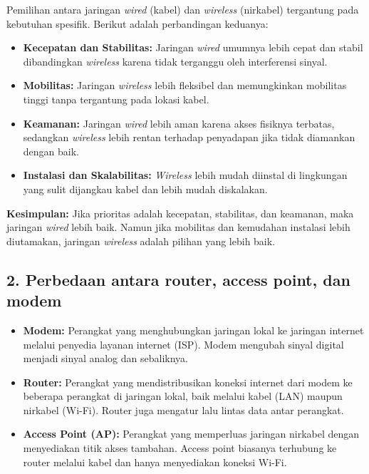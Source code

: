 Pemilihan antara jaringan \textit{wired} (kabel) dan \textit{wireless} (nirkabel) tergantung pada kebutuhan spesifik. Berikut adalah perbandingan keduanya:

\begin{itemize}
    \item \textbf{Kecepatan dan Stabilitas:} Jaringan \textit{wired} umumnya lebih cepat dan stabil dibandingkan \textit{wireless} karena tidak terganggu oleh interferensi sinyal.
    \item \textbf{Mobilitas:} Jaringan \textit{wireless} lebih fleksibel dan memungkinkan mobilitas tinggi tanpa tergantung pada lokasi kabel.
    \item \textbf{Keamanan:} Jaringan \textit{wired} lebih aman karena akses fisiknya terbatas, sedangkan \textit{wireless} lebih rentan terhadap penyadapan jika tidak diamankan dengan baik.
    \item \textbf{Instalasi dan Skalabilitas:} \textit{Wireless} lebih mudah diinstal di lingkungan yang sulit dijangkau kabel dan lebih mudah diskalakan.
\end{itemize}

\textbf{Kesimpulan:} Jika prioritas adalah kecepatan, stabilitas, dan keamanan, maka jaringan \textit{wired} lebih baik. Namun jika mobilitas dan kemudahan instalasi lebih diutamakan, jaringan \textit{wireless} adalah pilihan yang lebih baik.

\subsection*{2. Perbedaan antara router, access point, dan modem}

\begin{itemize}
    \item \textbf{Modem:} Perangkat yang menghubungkan jaringan lokal ke jaringan internet melalui penyedia layanan internet (ISP). Modem mengubah sinyal digital menjadi sinyal analog dan sebaliknya.
    
    \item \textbf{Router:} Perangkat yang mendistribusikan koneksi internet dari modem ke beberapa perangkat di jaringan lokal, baik melalui kabel (LAN) maupun nirkabel (Wi-Fi). Router juga mengatur lalu lintas data antar perangkat.
    
    \item \textbf{Access Point (AP):} Perangkat yang memperluas jaringan nirkabel dengan menyediakan titik akses tambahan. Access point biasanya terhubung ke router melalui kabel dan hanya menyediakan koneksi Wi-Fi.
\end{itemize}

